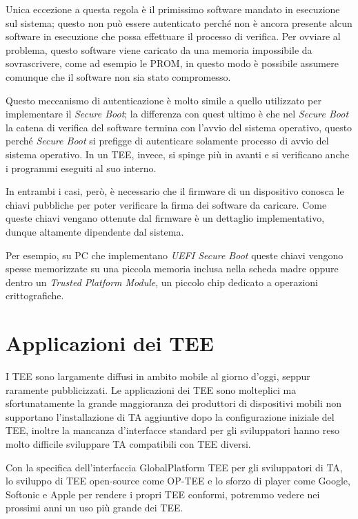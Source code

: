\documentclass[12pt,italian]{report}
\begin{document}
Unica eccezione a questa regola è il primissimo software mandato in esecuzione
sul sistema; questo non può essere autenticato perché non è ancora presente
alcun software in esecuzione che possa effettuare il processo di verifica.
Per ovviare al problema, questo software viene caricato da una memoria
impossibile da sovrascrivere, come ad esempio le PROM, in questo modo è
possibile assumere comunque che il software non sia stato compromesso.

Questo meccanismo di autenticazione è molto simile a quello utilizzato per
implementare il \textit{Secure Boot}; la differenza con quest ultimo è che
nel \textit{Secure Boot} la catena di verifica del software termina con
l'avvio del sistema operativo, questo perché \textit{Secure Boot} si prefigge
di autenticare solamente processo di avvio del sistema operativo.
In un TEE, invece, si spinge più in avanti e si verificano anche i programmi
eseguiti al suo interno.

In entrambi i casi, però, è necessario che il firmware di un dispositivo
conosca le chiavi pubbliche per poter verificare la firma dei software
da caricare. Come queste chiavi vengano ottenute dal firmware è un dettaglio
implementativo, dunque altamente dipendente dal sistema.

Per esempio, su PC che implementano \textit{UEFI Secure Boot} queste chiavi
vengono spesse memorizzate su una piccola memoria inclusa nella scheda madre %
oppure dentro un \textit{Trusted Platform Module}, %
un piccolo chip dedicato a operazioni crittografiche.

\section{Applicazioni dei TEE}
\label{sec:applicazioni-tee}
I TEE sono largamente diffusi in ambito mobile al giorno d'oggi, seppur
raramente pubblicizzati.
Le applicazioni dei TEE sono molteplici ma sfortunatamente la grande
maggioranza dei produttori di dispositivi mobili non supportano l'installazione di
TA aggiuntive dopo la configurazione iniziale del TEE, inoltre la mancanza
d'interfacce standard per gli sviluppatori hanno reso molto difficile
sviluppare TA compatibili con TEE diversi.

Con la specifica dell'interfaccia GlobalPlatform TEE per gli sviluppatori di
TA, lo sviluppo di TEE open-source come OP-TEE e lo sforzo di player come
Google, Softonic e Apple per rendere i propri TEE conformi, potremmo vedere
nei prossimi anni un uso più grande dei TEE.
\end{document}
